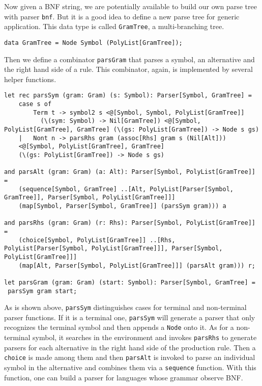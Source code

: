 Now given a BNF string, we are potentially available to build our own parse tree with parser \texttt{bnf}. But it is a good idea to define a new parse tree for generic application. This data type is called \texttt{GramTree}, a multi-branching tree.
\begin{lstlisting}
data GramTree = Node Symbol (PolyList[GramTree]);
\end{lstlisting}
Then we define a combinator \texttt{parsGram} that parses a symbol, an alternative and the right hand side of a rule. This combinator, again, is implemented by several helper functions.
\begin{lstlisting}
let rec parsSym (gram: Gram) (s: Symbol): Parser[Symbol, GramTree] =
    case s of
        Term t -> symbol2 s <@[Symbol, Symbol, PolyList[GramTree]]
          (\(sym: Symbol) -> Nil[GramTree]) <@[Symbol, PolyList[GramTree], GramTree] (\(gs: PolyList[GramTree]) -> Node s gs)
    |   Nont n -> parsRhs gram (assoc[Rhs] gram s (Nil[Alt]))
    <@[Symbol, PolyList[GramTree], GramTree]
    (\(gs: PolyList[GramTree]) -> Node s gs)

and parsAlt (gram: Gram) (a: Alt): Parser[Symbol, PolyList[GramTree]] =
    (sequence[Symbol, GramTree] ..[Alt, PolyList[Parser[Symbol, GramTree]], Parser[Symbol, PolyList[GramTree]]]
    (map[Symbol, Parser[Symbol, GramTree]] (parsSym gram))) a

and parsRhs (gram: Gram) (r: Rhs): Parser[Symbol, PolyList[GramTree]] =
    (choice[Symbol, PolyList[GramTree]] ..[Rhs, PolyList[Parser[Symbol, PolyList[GramTree]]], Parser[Symbol, PolyList[GramTree]]]
    (map[Alt, Parser[Symbol, PolyList[GramTree]]] (parsAlt gram))) r;

let parsGram (gram: Gram) (start: Symbol): Parser[Symbol, GramTree] =
 parsSym gram start;
\end{lstlisting}
As is shown above, \texttt{parsSym} distinguishes cases for terminal and non-terminal parser functions. If it is a terminal one, \texttt{parsSym} will generate a parser that only recognizes the terminal symbol and then appends a \texttt{Node} onto it. As for a non-terminal symbol, it searches in the environment and invokes \texttt{parsRhs} to generate parsers for each alternative in the right hand side of the production rule. Then a \texttt{choice} is made among them and then \texttt{parsAlt} is invoked to parse an individual symbol in the alternative and combines them via a \texttt{sequence} function. With this function, one can build a parser for languages whose grammar observe BNF.

